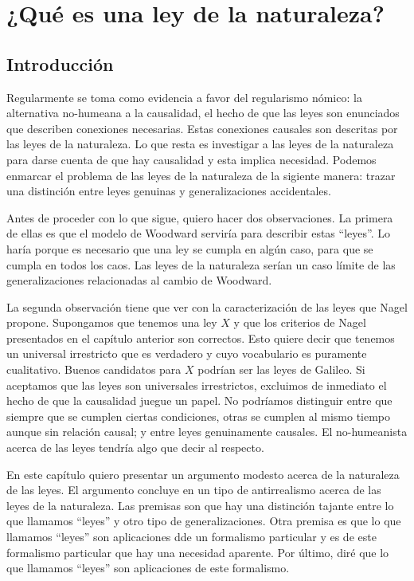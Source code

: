 \chapter{¿Qué es una ley de la naturaleza?}

\section{Introducción}

\noindentm Regularmente se toma como evidencia a favor del regularismo nómico: la alternativa no-humeana a la causalidad, el hecho de que las leyes son enunciados que describen conexiones necesarias. Estas conexiones causales son descritas por las leyes de la naturaleza. Lo que resta es investigar a las leyes de la naturaleza para darse cuenta de que hay causalidad y esta implica necesidad. Podemos enmarcar el problema de las leyes de la naturaleza de la sigiente manera: trazar una distinción entre leyes genuinas y generalizaciones accidentales.

Antes de proceder con lo que sigue, quiero hacer dos observaciones. La primera de ellas es que el modelo de Woodward serviría para describir estas ``leyes''. Lo haría porque es necesario que una ley se cumpla en algún caso, para que se cumpla en todos los caos. Las leyes de la naturaleza serían un caso límite de las generalizaciones relacionadas al cambio de Woodward.

La segunda observación tiene que ver con la caracterización de las leyes que Nagel propone. Supongamos que tenemos una ley $X$ y que los criterios de Nagel presentados en el capítulo anterior son correctos. Esto quiere decir que tenemos un universal irrestricto que es verdadero y cuyo vocabulario es puramente cualitativo. Buenos candidatos para $X$ podrían ser las leyes de Galileo. Si aceptamos que las leyes son universales irrestrictos, excluimos de inmediato el hecho de que la causalidad juegue un papel. No podríamos distinguir entre que siempre que se cumplen ciertas condiciones, otras se cumplen al mismo tiempo aunque sin relación causal; y entre leyes genuinamente causales. El no-humeanista acerca de las leyes tendría algo que decir al respecto.

En este capítulo quiero presentar un argumento modesto acerca de la naturaleza de las leyes. El argumento concluye en un tipo de antirrealismo acerca de las leyes de la naturaleza. Las premisas son que hay una distinción tajante entre lo que llamamos ``leyes'' y otro tipo de generalizaciones. Otra premisa es que lo que llamamos ``leyes'' son aplicaciones dde un formalismo particular y es de este formalismo particular que hay una necesidad aparente. Por último, diré que lo que llamamos ``leyes'' son aplicaciones de este formalismo.

